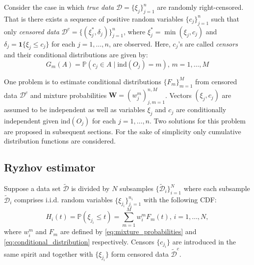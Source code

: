 \documentclass[12pt,reqno,a4paper,oneside,draft]{article}
\theoremstyle{plain}
\theoremstyle{definition}
\theoremstyle{remark}
\begin{document}
Consider the case in which \emph{true data} $\mathcal D = \{\xi _j\}_{j=1}^n$ are randomly right-censored. That is there exists a sequence of positive random variables $\{c_j\}_{j=1}^n$ such that only \emph{censored data} $\mathcal D^c = \{(\xi _j^*, \delta _j)\}_{j=1}^n$, where $\xi _j^* = \min (\xi _j, c_j)$ and $\delta _j = \mathbf 1\{\xi _j \leq c_j\}$ for each $j=1,\ldots ,n$, are observed. Here, $c_j$'s are called \emph{censors} and their conditional distributions are given by:
\begin{equation}
G_m (A) = \mathbb P(c _j \in A \mid \mathrm{ind}(O_j) = m),\, m=1,\ldots , M
\end{equation} 

One problem is to estimate conditional distributions $\{F_m\}_{m=1}^M$ from censored data $\mathcal D^c$ and mixture probabilities $\mathbf W = (w_j^m)_{j,m=1}^{n,M}$. Vectors $(\xi _j, c _j)$ are assumed to be independent as well as variables $\xi _j$ and $c_j$ are conditionally independent given $\mathrm{ind}(O_j)$ for each $j=1,\ldots ,n$. Two solutions for this problem are proposed in subsequent sections. For the sake of simplicity only cumulative distribution functions are considered.

\subsection{Ryzhov estimator}
\label{subsec:ryzhov_estimator}
Suppose a data set $\tilde {\mathcal D}$ is divided by $N$ subsamples $\{\tilde{\mathcal D} _i\}_{i=1}^N$ where each subsample $\tilde{\mathcal D}_i$ comprises i.i.d. random variables $\{\xi _{j_i} \}_{j_i=1}^{n_i}$ with the following CDF:
\begin{equation}
\label{eq:Ryzhov_mixture_distribution}
H_i(t) = \mathbb P(\xi _{j_i} \leq t) = \sum _{m=1}^M w_i^mF_m(t), \, i = 1,\ldots, N,
\end{equation}
where $w_i^m$ and $F_m$ are defined by \eqref{eq:mixture_probabilities} and \eqref{eq:conditional_distribution} respectively. Censors $\{c_{j_i} \}$ are introduced in the same spirit and together with $\{\xi _{j_i}\}$ form censored data $\tilde{\mathcal D}^c$.
\end{document}

